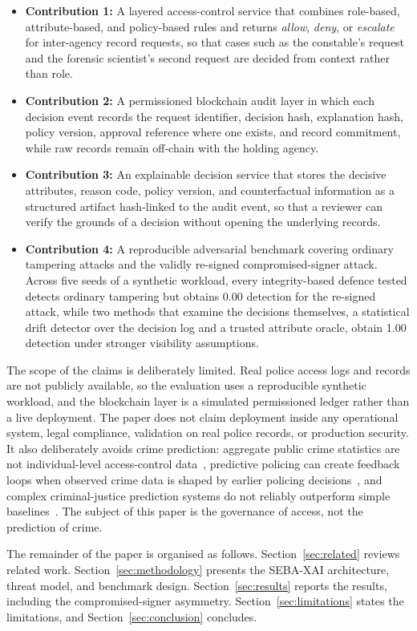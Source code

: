 \begin{itemize}
    \item \textbf{Contribution 1:} A layered access-control service that
    combines role-based, attribute-based, and policy-based rules and returns
    \emph{allow}, \emph{deny}, or \emph{escalate} for inter-agency record
    requests, so that cases such as the constable's request and the forensic
    scientist's second request are decided from context rather than role.

    \item \textbf{Contribution 2:} A permissioned blockchain audit layer in
    which each decision event records the request identifier, decision hash,
    explanation hash, policy version, approval reference where one exists,
    and record commitment, while raw records remain off-chain with the
    holding agency.

    \item \textbf{Contribution 3:} An explainable decision service that
    stores the decisive attributes, reason code, policy version, and
    counterfactual information as a structured artifact hash-linked to the
    audit event, so that a reviewer can verify the grounds of a decision
    without opening the underlying records.

    \item \textbf{Contribution 4:} A reproducible adversarial benchmark
    covering ordinary tampering attacks and the validly re-signed
    compromised-signer attack. Across five seeds of a synthetic workload,
    every integrity-based defence tested detects ordinary tampering but
    obtains 0.00 detection for the re-signed attack, while two methods that
    examine the decisions themselves, a statistical drift detector over the
    decision log and a trusted attribute oracle, obtain 1.00 detection under
    stronger visibility assumptions.
\end{itemize}

The scope of the claims is deliberately limited. Real police access logs and
records are not publicly available, so the evaluation uses a reproducible
synthetic workload, and the blockchain layer is a simulated permissioned
ledger rather than a live deployment. The paper does not claim deployment
inside any operational system, legal compliance, validation on real police
records, or production security. It also deliberately avoids crime
prediction: aggregate public crime statistics are not individual-level
access-control data~\cite{ncrb_2023}, predictive policing can create
feedback loops when observed crime data is shaped by earlier policing
decisions~\cite{ensign_feedback_2018}, and complex criminal-justice
prediction systems do not reliably outperform simple
baselines~\cite{dressel_fairness_limits_2018}. The subject of this paper is
the governance of access, not the prediction of crime.

The remainder of the paper is organised as follows.
Section~\ref{sec:related} reviews related work.
Section~\ref{sec:methodology} presents the SEBA-XAI architecture, threat
model, and benchmark design. Section~\ref{sec:results} reports the results,
including the compromised-signer asymmetry.
Section~\ref{sec:limitations} states the limitations, and
Section~\ref{sec:conclusion} concludes.
